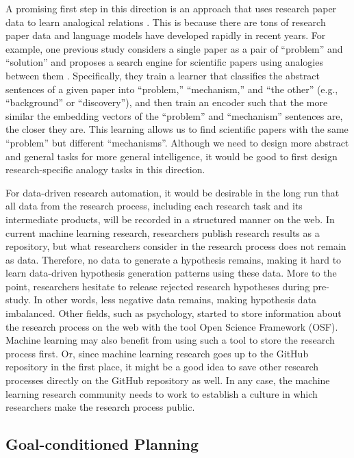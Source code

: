 \documentclass{article}
\begin{document}
A promising first step in this direction is an approach that uses research paper data to learn analogical relations \cite{kang2022augmenting,chan2018solvent}. This is because there are tons of research paper data and language models have developed rapidly in recent years. For example, one previous study considers a single paper as a pair of ``problem'' and ``solution'' and proposes a search engine for scientific papers using analogies between them \cite{chan2018solvent,kang2022augmenting}. Specifically, they train a learner that classifies the abstract sentences of a given paper into ``problem,'' ``mechanism,'' and ``the other'' (e.g., ``background'' or ``discovery''), and then train an encoder such that the more similar the embedding vectors of the ``problem'' and ``mechanism'' sentences are, the closer they are. This learning allows us to find scientific papers with the same ``problem'' but different ``mechanisms''. Although we need to design more abstract and general tasks for more general intelligence, it would be good to first design research-specific analogy tasks in this direction.

For data-driven research automation, it would be desirable in the long run that all data from the research process, including each research task and its intermediate products, will be recorded in a structured manner on the web. In current machine learning research, researchers publish research results as a repository, but what researchers consider in the research process does not remain as data. Therefore, no data to generate a hypothesis remains, making it hard to learn data-driven hypothesis generation patterns using these data. More to the point, researchers hesitate to release rejected research hypotheses during pre-study. In other words, less negative data remains, making hypothesis data imbalanced. Other fields, such as psychology, started to store information about the research process on the web with the tool Open Science Framework (OSF)\cite{foster2017open}. Machine learning may also benefit from using such a tool to store the research process first. Or, since machine learning research goes up to the GitHub repository in the first place, it might be a good idea to save other research processes directly on the GitHub repository as well. In any case, the machine learning research community needs to work to establish a culture in which researchers make the research process public.

\subsection{Goal-conditioned Planning}
\end{document}
